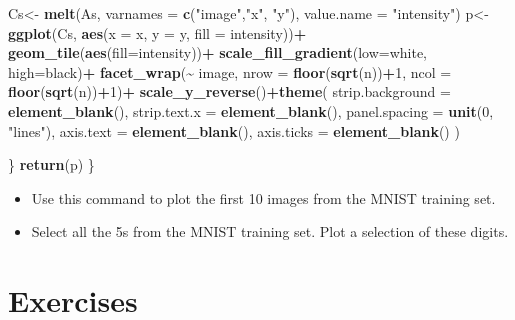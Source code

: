 \documentclass[
]{book}
\newenvironment{Shaded}{\begin{snugshade}}{\end{snugshade}}
\newcommand{\AttributeTok}[1]{\textcolor[rgb]{0.13,0.29,0.53}{#1}}
\newcommand{\DecValTok}[1]{\textcolor[rgb]{0.00,0.00,0.81}{#1}}
\newcommand{\FunctionTok}[1]{\textcolor[rgb]{0.13,0.29,0.53}{\textbf{#1}}}
\newcommand{\NormalTok}[1]{#1}
\newcommand{\OtherTok}[1]{\textcolor[rgb]{0.56,0.35,0.01}{#1}}
\newcommand{\SpecialCharTok}[1]{\textcolor[rgb]{0.81,0.36,0.00}{\textbf{#1}}}
\newcommand{\StringTok}[1]{\textcolor[rgb]{0.31,0.60,0.02}{#1}}
\theoremstyle{definition}
\theoremstyle{definition}
\theoremstyle{definition}
\theoremstyle{definition}
\theoremstyle{remark}
\begin{document}
\begin{Shaded}
\begin{Highlighting}[]
\NormalTok{    Cs}\OtherTok{\textless{}{-}} \FunctionTok{melt}\NormalTok{(As, }\AttributeTok{varnames =} \FunctionTok{c}\NormalTok{(}\StringTok{"image"}\NormalTok{,}\StringTok{"x"}\NormalTok{, }\StringTok{"y"}\NormalTok{), }
              \AttributeTok{value.name =} \StringTok{"intensity"}\NormalTok{)}
\NormalTok{    p}\OtherTok{\textless{}{-}}\FunctionTok{ggplot}\NormalTok{(Cs, }\FunctionTok{aes}\NormalTok{(}\AttributeTok{x =}\NormalTok{ x, }\AttributeTok{y =}\NormalTok{ y, }\AttributeTok{fill =}\NormalTok{ intensity))}\SpecialCharTok{+}
      \FunctionTok{geom\_tile}\NormalTok{(}\FunctionTok{aes}\NormalTok{(}\AttributeTok{fill=}\NormalTok{intensity))}\SpecialCharTok{+}
      \FunctionTok{scale\_fill\_gradient}\NormalTok{(}\AttributeTok{low=}\StringTok{\textquotesingle{}white\textquotesingle{}}\NormalTok{, }\AttributeTok{high=}\StringTok{\textquotesingle{}black\textquotesingle{}}\NormalTok{)}\SpecialCharTok{+}
      \FunctionTok{facet\_wrap}\NormalTok{(}\SpecialCharTok{\textasciitilde{}}\NormalTok{ image, }\AttributeTok{nrow =} \FunctionTok{floor}\NormalTok{(}\FunctionTok{sqrt}\NormalTok{(n))}\SpecialCharTok{+}\DecValTok{1}\NormalTok{, }
                 \AttributeTok{ncol =} \FunctionTok{floor}\NormalTok{(}\FunctionTok{sqrt}\NormalTok{(n))}\SpecialCharTok{+}\DecValTok{1}\NormalTok{)}\SpecialCharTok{+}
      \FunctionTok{scale\_y\_reverse}\NormalTok{()}\SpecialCharTok{+}\FunctionTok{theme}\NormalTok{(}
        \AttributeTok{strip.background =} \FunctionTok{element\_blank}\NormalTok{(),}
        \AttributeTok{strip.text.x =} \FunctionTok{element\_blank}\NormalTok{(),}
        \AttributeTok{panel.spacing =} \FunctionTok{unit}\NormalTok{(}\DecValTok{0}\NormalTok{, }\StringTok{"lines"}\NormalTok{),}
        \AttributeTok{axis.text =} \FunctionTok{element\_blank}\NormalTok{(),}
        \AttributeTok{axis.ticks =} \FunctionTok{element\_blank}\NormalTok{()}
\NormalTok{      ) }
    
\NormalTok{  \}}
  \FunctionTok{return}\NormalTok{(p)}
\NormalTok{\}}
\end{Highlighting}
\end{Shaded}

\begin{itemize}
\item
  Use this command to plot the first 10 images from the MNIST training set.
\item
  Select all the 5s from the MNIST training set. Plot a selection of these digits.
\end{itemize}

\section{Exercises}\label{exercises}
\end{document}
